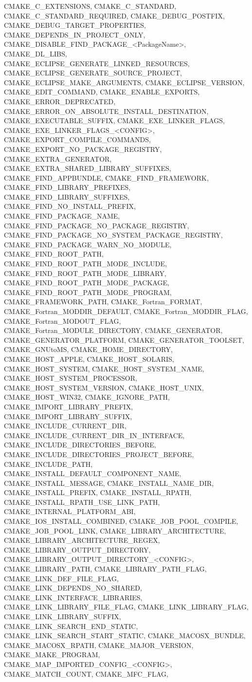 {{CMAKE_C_EXTENSIONS,
CMAKE_C_STANDARD,
CMAKE_C_STANDARD_REQUIRED,
CMAKE_DEBUG_POSTFIX,
CMAKE_DEBUG_TARGET_PROPERTIES,
CMAKE_DEPENDS_IN_PROJECT_ONLY,
CMAKE_DISABLE_FIND_PACKAGE_<PackageName>,
CMAKE_DL_LIBS,
CMAKE_ECLIPSE_GENERATE_LINKED_RESOURCES,
CMAKE_ECLIPSE_GENERATE_SOURCE_PROJECT,
CMAKE_ECLIPSE_MAKE_ARGUMENTS,
CMAKE_ECLIPSE_VERSION,
CMAKE_EDIT_COMMAND,
CMAKE_ENABLE_EXPORTS,
CMAKE_ERROR_DEPRECATED,
CMAKE_ERROR_ON_ABSOLUTE_INSTALL_DESTINATION,
CMAKE_EXECUTABLE_SUFFIX,
CMAKE_EXE_LINKER_FLAGS,
CMAKE_EXE_LINKER_FLAGS_<CONFIG>,
CMAKE_EXPORT_COMPILE_COMMANDS,
CMAKE_EXPORT_NO_PACKAGE_REGISTRY,
CMAKE_EXTRA_GENERATOR,
CMAKE_EXTRA_SHARED_LIBRARY_SUFFIXES,
CMAKE_FIND_APPBUNDLE,
CMAKE_FIND_FRAMEWORK,
CMAKE_FIND_LIBRARY_PREFIXES,
CMAKE_FIND_LIBRARY_SUFFIXES,
CMAKE_FIND_NO_INSTALL_PREFIX,
CMAKE_FIND_PACKAGE_NAME,
CMAKE_FIND_PACKAGE_NO_PACKAGE_REGISTRY,
CMAKE_FIND_PACKAGE_NO_SYSTEM_PACKAGE_REGISTRY,
CMAKE_FIND_PACKAGE_WARN_NO_MODULE,
CMAKE_FIND_ROOT_PATH,
CMAKE_FIND_ROOT_PATH_MODE_INCLUDE,
CMAKE_FIND_ROOT_PATH_MODE_LIBRARY,
CMAKE_FIND_ROOT_PATH_MODE_PACKAGE,
CMAKE_FIND_ROOT_PATH_MODE_PROGRAM,
CMAKE_FRAMEWORK_PATH,
CMAKE_Fortran_FORMAT,
CMAKE_Fortran_MODDIR_DEFAULT,
CMAKE_Fortran_MODDIR_FLAG,
CMAKE_Fortran_MODOUT_FLAG,
CMAKE_Fortran_MODULE_DIRECTORY,
CMAKE_GENERATOR,
CMAKE_GENERATOR_PLATFORM,
CMAKE_GENERATOR_TOOLSET,
CMAKE_GNUtoMS,
CMAKE_HOME_DIRECTORY,
CMAKE_HOST_APPLE,
CMAKE_HOST_SOLARIS,
CMAKE_HOST_SYSTEM,
CMAKE_HOST_SYSTEM_NAME,
CMAKE_HOST_SYSTEM_PROCESSOR,
CMAKE_HOST_SYSTEM_VERSION,
CMAKE_HOST_UNIX,
CMAKE_HOST_WIN32,
CMAKE_IGNORE_PATH,
CMAKE_IMPORT_LIBRARY_PREFIX,
CMAKE_IMPORT_LIBRARY_SUFFIX,
CMAKE_INCLUDE_CURRENT_DIR,
CMAKE_INCLUDE_CURRENT_DIR_IN_INTERFACE,
CMAKE_INCLUDE_DIRECTORIES_BEFORE,
CMAKE_INCLUDE_DIRECTORIES_PROJECT_BEFORE,
CMAKE_INCLUDE_PATH,
CMAKE_INSTALL_DEFAULT_COMPONENT_NAME,
CMAKE_INSTALL_MESSAGE,
CMAKE_INSTALL_NAME_DIR,
CMAKE_INSTALL_PREFIX,
CMAKE_INSTALL_RPATH,
CMAKE_INSTALL_RPATH_USE_LINK_PATH,
CMAKE_INTERNAL_PLATFORM_ABI,
CMAKE_IOS_INSTALL_COMBINED,
CMAKE_JOB_POOL_COMPILE,
CMAKE_JOB_POOL_LINK,
CMAKE_LIBRARY_ARCHITECTURE,
CMAKE_LIBRARY_ARCHITECTURE_REGEX,
CMAKE_LIBRARY_OUTPUT_DIRECTORY,
CMAKE_LIBRARY_OUTPUT_DIRECTORY_<CONFIG>,
CMAKE_LIBRARY_PATH,
CMAKE_LIBRARY_PATH_FLAG,
CMAKE_LINK_DEF_FILE_FLAG,
CMAKE_LINK_DEPENDS_NO_SHARED,
CMAKE_LINK_INTERFACE_LIBRARIES,
CMAKE_LINK_LIBRARY_FILE_FLAG,
CMAKE_LINK_LIBRARY_FLAG,
CMAKE_LINK_LIBRARY_SUFFIX,
CMAKE_LINK_SEARCH_END_STATIC,
CMAKE_LINK_SEARCH_START_STATIC,
CMAKE_MACOSX_BUNDLE,
CMAKE_MACOSX_RPATH,
CMAKE_MAJOR_VERSION,
CMAKE_MAKE_PROGRAM,
CMAKE_MAP_IMPORTED_CONFIG_<CONFIG>,
CMAKE_MATCH_COUNT,
CMAKE_MFC_FLAG,
}}
